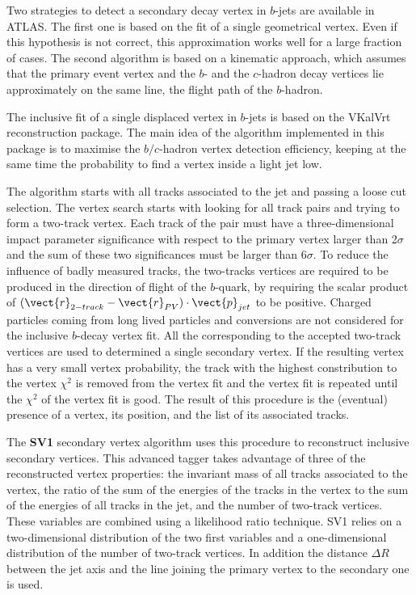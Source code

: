 Two strategies to detect a secondary decay vertex in $b$-jets are available in ATLAS. The first one is based on the fit of a single geometrical vertex. Even if this hypothesis is not correct, this approximation works well for a large fraction of cases.  The second algorithm is based on a kinematic approach, which assumes that the primary event vertex and the $b$- and the $c$-hadron decay vertices lie approximately on the same line, the flight path of the $b$-hadron. 

The inclusive fit of a single displaced vertex in $b$-jets is based on the VKalVrt~\cite{Kostyukhin:685551} reconstruction package. The main idea of the algorithm implemented in this package is to maximise the $b/c$-hadron vertex detection efficiency, keeping at the same time the probability to find a vertex inside a light jet low. 

The algorithm starts with all tracks associated to the jet and passing a loose cut selection. The vertex search starts with looking for all track pairs and trying to form a two-track vertex. Each track of the pair must have a three-dimensional impact parameter significance with respect to the primary vertex larger than 2$\sigma$ and the sum of these two significances must be larger than 6$\sigma$. To reduce the influence of badly measured tracks, the two-tracks vertices are required to be produced in the direction of flight of the $b$-quark, by requiring the scalar product of $(\vect{r}_{2-track} - \vect{r}_{PV})\cdot \vect{p}_{jet} $ to be positive. Charged particles coming from long lived particles and conversions are not considered for the inclusive $b$-decay vertex fit. All the corresponding to the accepted two-track vertices are used to determined a single secondary vertex.  If the resulting vertex has a very small vertex probability, the track with the highest constribution to the vertex $\chi^2$  is removed from the vertex fit and the vertex fit is repeated until the $\chi^2$ of the vertex fit is good. The result of this procedure is the (eventual) presence of a vertex, its position, and the list of its associated tracks.

The \textbf{SV1} secondary vertex algorithm uses this procedure to reconstruct inclusive secondary vertices. This advanced tagger takes advantage of three of the reconstructed vertex properties: the invariant mass of all tracks associated to the vertex, the ratio of the sum of the energies of the tracks in the vertex to the sum of the energies of all tracks in the jet, and the number of two-track vertices. These variables are combined using a likelihood ratio technique. SV1 relies on a two-dimensional distribution of the two first variables and a one-dimensional distribution of the number of two-track vertices. In addition the distance $\Delta R$ between the jet axis and the line joining the primary vertex to the secondary one is used. 

